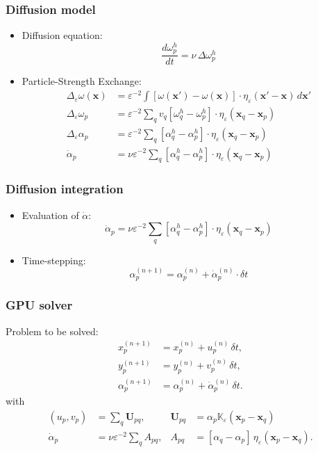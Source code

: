 \documentclass[12pt,english,dvipsnames]{beamer}
\newcommand{\K}{\mathbb{K}}  %
\renewcommand{\vec}{\mathbf}
\newcommand{\x}{\vec x}      %
\newcommand{\od}[2]{\frac{d#1}{d#2}}
\begin{document}
  \begin{frame}
    \frametitle{Diffusion model}
    \begin{itemize}
      \item Diffusion equation:
        \begin{equation}
          \od{ω^h_p}{t} = ν\,Δω^h_p
        \end{equation}
      \item Particle-Strength Exchange:
        \begin{align}
          Δ_ε ω(\x) &= ε^{-2} \int [ω(\x') - ω(\x)]\cdot η_ε(\x' - \x)\,d\x' \\
          Δ_ε ω_p &= ε^{-2} \sum_q v_q [ω_q^h - ω_p^h]\cdot η_ε(\x_q - \x_p) \\
          Δ_ε α_p &= ε^{-2} \sum_q [α_q^h - α_p^h]\cdot η_ε(\x_q - \x_p) \\
          \dot{α}_p &= νε^{-2} \sum_q [α_q^h - α_p^h]\cdot η_ε(\x_q - \x_p)
        \end{align}
    \end{itemize}
  \end{frame}

  \begin{frame}
    \frametitle{Diffusion integration}
    \begin{itemize}
      \item Evaluation of \(\dot{α}\):
        \begin{equation}
          \dot{α}_p = νε^{-2} \sum_q [α_q^h - α_p^h]\cdot η_ε(\x_q - \x_p)
        \end{equation}
      \item Time-stepping:
        \begin{equation}
          α_p^{(n + 1)} = α_p^{(n)} + \dot{α}_p^{(n)}\cdot δt
        \end{equation}
    \end{itemize}
  \end{frame}

  \begin{frame}
    \frametitle{GPU solver}
    Problem to be solved:
    \begin{align}
      x_p^{(n + 1)} &= x_p^{(n)} + u_p^{(n)}\, δt, \\
      y_p^{(n + 1)} &= y_p^{(n)} + v_p^{(n)}\, δt, \\
      α_p^{(n + 1)} &= α_p^{(n)} + \dot{α}_p^{(n)}\, δt.
    \end{align}
    with
    \begin{align}
        (u_p, v_p) &= \sum_q \vec{U}_{pq},   & \vec{U}_{pq} &= α_p \K_ε(\x_p - \x_q) \\
        \dot{α}_p  &= νε^{-2} \sum_q A_{pq}, &       A_{pq} &= [α_q - α_p]\,η_ε(\x_p - \x_q).
    \end{align}
  \end{frame}
\end{document}
